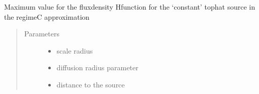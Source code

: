 \documentclass[letterpaper,10pt,english]{sphinxmanual}
\begin{document}
\begin{fulllineitems}
\label{\detokenize{diffsph.profiles:diffsph.profiles.analytics.cofdCmax}}
\sphinxAtStartPar
Maximum value for the flux\sphinxhyphen{}density H\sphinxhyphen{}function for the ‘constant’ top\sphinxhyphen{}hat source in the regime\sphinxhyphen{}C approximation
\begin{quote}\begin{description}
\item[{Parameters}] \leavevmode\begin{itemize}
\item {} 
\sphinxAtStartPar
{} \textendash{} scale radius

\item {} 
\sphinxAtStartPar
{} \textendash{} diffusion radius parameter

\item {} 
\sphinxAtStartPar
{} \textendash{} distance to the source

\end{itemize}

\end{description}\end{quote}

\end{fulllineitems}

\end{document}

